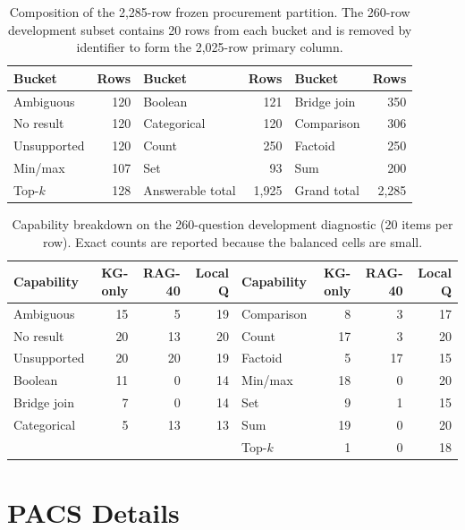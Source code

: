 \begin{table}[h]
  \centering
  \caption{Composition of the 2,285-row frozen procurement partition.  The 260-row development
  subset contains 20 rows from each bucket and is removed by identifier to form the 2,025-row
  primary column.}
  \label{tab:final-buckets}
  \small
  \begin{tabular}{lr@{\hskip 2.2em}lr@{\hskip 2.2em}lr}
    \toprule
    Bucket & Rows & Bucket & Rows & Bucket & Rows \\
    \midrule
    Ambiguous & 120 & Boolean & 121 & Bridge join & 350 \\
    No result & 120 & Categorical & 120 & Comparison & 306 \\
    Unsupported & 120 & Count & 250 & Factoid & 250 \\
    Min/max & 107 & Set & 93 & Sum & 200 \\
    Top-$k$ & 128 & Answerable total & 1,925 & Grand total & 2,285 \\
    \bottomrule
  \end{tabular}
\end{table}

\begin{table}[h]
  \centering
  \caption{Capability breakdown on the 260-question development diagnostic (20 items per row).
  Exact counts are reported because the balanced cells are small.}
  \label{tab:bucket-analysis}
  \small
  \begin{tabular}{lrrr@{\qquad}lrrr}
    \toprule
    Capability & KG-only & RAG-40 & Local Q & Capability & KG-only & RAG-40 & Local Q \\
    \midrule
    Ambiguous & 15 & 5 & 19 & Comparison & 8 & 3 & 17 \\
    No result & 20 & 13 & 20 & Count & 17 & 3 & 20 \\
    Unsupported & 20 & 20 & 19 & Factoid & 5 & 17 & 15 \\
    Boolean & 11 & 0 & 14 & Min/max & 18 & 0 & 20 \\
    Bridge join & 7 & 0 & 14 & Set & 9 & 1 & 15 \\
    Categorical & 5 & 13 & 13 & Sum & 19 & 0 & 20 \\
    & & & & Top-$k$ & 1 & 0 & 18 \\
    \bottomrule
  \end{tabular}
\end{table}

\section{PACS Details}
\label{app:pacs}

